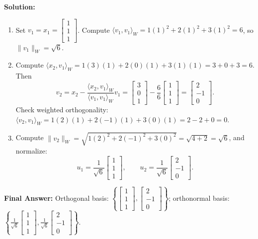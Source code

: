 \documentclass[11pt, letterpaper]{article}
\theoremstyle{definition}
\theoremstyle{remark}
\begin{document}
\textbf{Solution:}
\begin{enumerate}[label=\textbf{Step \arabic*:}]
    \item Set $v_1 = x_1 = \begin{bmatrix} 1 \\ 1 \\ 1 \end{bmatrix}$. Compute $\langle v_1, v_1 \rangle_W = 1(1)^2 + 2(1)^2 + 3(1)^2 = 6$, so $\|v_1\|_W = \sqrt{6}$.
    \item Compute $\langle x_2, v_1 \rangle_W = 1(3)(1) + 2(0)(1) + 3(1)(1) = 3 + 0 + 3 = 6$. Then
    \[
        v_2 = x_2 - \frac{\langle x_2, v_1 \rangle_W}{\langle v_1, v_1 \rangle_W} v_1 = \begin{bmatrix} 3 \\ 0 \\ 1 \end{bmatrix} - \frac{6}{6}\begin{bmatrix} 1 \\ 1 \\ 1 \end{bmatrix} = \begin{bmatrix} 2 \\ -1 \\ 0 \end{bmatrix}.
    \]
    Check weighted orthogonality: $\langle v_2, v_1 \rangle_W = 1(2)(1) + 2(-1)(1) + 3(0)(1) = 2 - 2 + 0 = 0$.
    \item Compute $\|v_2\|_W = \sqrt{1(2)^2 + 2(-1)^2 + 3(0)^2} = \sqrt{4 + 2} = \sqrt{6}$, and normalize:
    \[
        u_1 = \frac{1}{\sqrt{6}}\begin{bmatrix} 1 \\ 1 \\ 1 \end{bmatrix}, \qquad u_2 = \frac{1}{\sqrt{6}}\begin{bmatrix} 2 \\ -1 \\ 0 \end{bmatrix}.
    \]
\end{enumerate}
\textbf{Final Answer:} Orthogonal basis: $\left\{ \begin{bmatrix} 1 \\ 1 \\ 1 \end{bmatrix}, \begin{bmatrix} 2 \\ -1 \\ 0 \end{bmatrix} \right\}$; orthonormal basis: $\left\{ \frac{1}{\sqrt{6}}\begin{bmatrix} 1 \\ 1 \\ 1 \end{bmatrix}, \frac{1}{\sqrt{6}}\begin{bmatrix} 2 \\ -1 \\ 0 \end{bmatrix} \right\}$.
\end{document}
